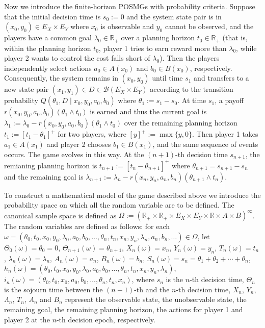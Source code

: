 \documentclass[12pt]{article}
\begin{document}
Now we introduce the finite-horizon POSMGs with probability criteria.
Suppose that the initial decision time is $s_0:=0$ and the system state pair is in $(x_0,y_0)\in E_X\times E_Y$ where $x_0$ is observable and $y_0$ cannot be observed, and the players have a common goal $\lambda_0\in\mathbb{R}_+$ over a planning horizon $t_0\in\mathbb{R}_+$ (that is, within the planning horizon $t_0$, player 1 tries to earn reward more than $\lambda_0$, while player 2 wants to control the cost falls short of $\lambda_0$). Then the players independently select actions $a_0\in A(x_0)$ and $b_0\in B(x_0)$, respectively.
Consequently, the system remains in $(x_0,y_0)$ until time $s_1$ and transfers to a new state pair $(x_1,y_1)\in D\in \mathscr{B}(E_X\times E_Y)$ according to the transition probability $Q(\theta_1,D\mid x_0,y_0,a_0,b_0)$ where $\theta_1:=s_1-s_0$. At time $s_1$, a payoff $r(x_0,y_0,a_0,b_0)(\theta_1\wedge t_0)$ is earned and thus the current goal is $\lambda_1:=\lambda_0-r(x_0,y_0,a_0,b_0)(\theta_1\wedge t_0)$ over the remaining planning horizon $t_1:=[t_1-\theta_1]^+$ for two players, where $[y]^+:=\max\{y,0\}$. Then player 1 takes $a_1\in A(x_1)$ and player 2 chooses $b_1\in B(x_1)$, and the same sequence of events occurs.
The game evolves in this way.
At the $(n+1)$-th decision time $s_{n+1}$, the remianing planning horizon is $t_{n+1}:=[t_n-\theta_{n+1}]^+$ where $\theta_{n+1}=s_{n+1}-s_n$ and the remaining goal is $\lambda_{n+1}:=\lambda_n-r(x_n,y_n,a_n,b_n)(\theta_{n+1}\wedge t_n)$.

To construct a mathematical model of the game described above we introduce the probability space on which all the random variable are to be defined.
The canonical sample space is defined as $\Omega:=(\mathbb{R}_+\times \mathbb{R}_+\times E_X\times E_Y\times \mathbb{R}\times A\times B)^{\infty}$.
The random variables are defined as follows:
for each $\omega=(\theta_0,t_0,x_0,y_0,\lambda_0,a_0,b_0,\ldots, \theta_n,t_n,x_n,y_n,\lambda_n,a_n,b_n,\ldots)\in\Omega$,
let $\Theta_0(\omega)=\theta_0=0$, $\Theta_{n+1}(\omega)=\theta_{n+1}$, $X_n(\omega)=x_n$, $Y_n(\omega)=y_n$, $T_n(\omega)=t_n$, $\lambda_n(\omega)=\lambda_n$, $A_n(\omega)=a_n$, $B_n(\omega)=b_n$, $S_n(\omega)=s_n=\theta_1+\theta_2+\cdots+\theta_n$,
$h_n(\omega)=(\theta_0,t_0,x_0,y_0,\lambda_0,a_0,b_0,\ldots, \theta_n,t_n,x_n,y_n,\lambda_n)$,
$i_n(\omega)=(\theta_0,t_0,x_0,a_0,b_0,\ldots, \theta_n,t_n,x_n)$,
where $s_n$ is the $n$-th decision time, $\Theta_n$ is the sojourn time between the $(n-1)$-th and the $n$-th decision time, $X_n$, $Y_n$, $\Lambda_n$, $T_n$,
$A_n$ and $B_n$ represent the observable state, the unobservable state, the remaining goal, the remaining planning horizon, the actions for player 1 and player 2 at the $n$-th  decision epoch, respectively.
\end{document}
